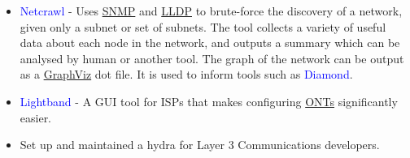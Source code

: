 \documentclass[10pt,letterpaper,sans]{moderncv}
\newcommand{\wlink}[2]{\textcolor[HTML]{461645}{\href{#1}{#2}}}
\begin{document}
{\begin{itemize}
  \item \textcolor{blue}{Netcrawl} - Uses \wlink{https://en.wikipedia.org/wiki/Simple_Network_Management_Protocol}{SNMP} and \wlink{https://en.wikipedia.org/wiki/Link_Layer_Discovery_Protocol}{LLDP} to brute-force the discovery of a network, given only a subnet or set of subnets. The tool collects a variety of useful data about each node in the network, and outputs a summary which can be analysed by human or another tool. The graph of the network can be output as a \wlink{http://www.graphviz.org/}{GraphViz} dot file. It is used to inform tools such as \textcolor{blue}{Diamond}.
  \item \textcolor{blue}{Lightband} - A GUI tool for ISPs that makes configuring \wlink{https://en.wikipedia.org/wiki/Network_interface_device\#Optical_network_terminals}{ONTs} significantly easier.
  \item Set up and maintained a hydra for Layer 3 Communications developers.
\end{itemize}
}

\end{document}
